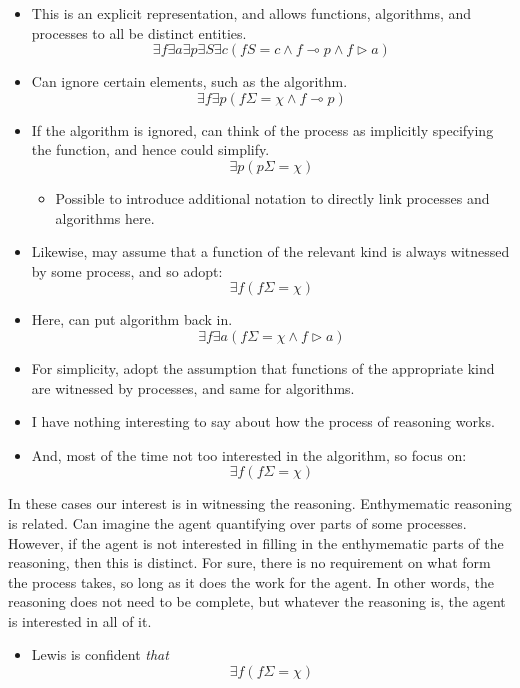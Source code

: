 \documentclass[10pt]{article}
\newcommand{\futin}{\ensuremath{\Sigma}}
\newcommand{\futout}{\ensuremath{\chi}}
\begin{document}
\begin{itemize}
\item This is an explicit representation, and allows functions, algorithms, and processes to all be distinct entities.
  \[\exists f \exists a \exists p \exists S \exists c(fS = c \land f \multimap p \land f \triangleright a)\]
\item Can ignore certain elements, such as the algorithm.
  \[\exists f \exists p(f\futin = \futout \land f \multimap p)\]
\item If the algorithm is ignored, can think of the process as implicitly specifying the function, and hence could simplify.
  \[\exists p(p\futin = \futout)\]
  \begin{itemize}
  \item Possible to introduce additional notation to directly link processes and algorithms here.
  \end{itemize}
\item Likewise, may assume that a function of the relevant kind is always witnessed by some process, and so adopt:
  \[\exists f(f\futin = \futout)\]
\item Here, can put algorithm back in.
  \[\exists f \exists a(f\futin = \futout \land f \triangleright a)\]
\item For simplicity, adopt the assumption that functions of the appropriate kind are witnessed by processes, and same for algorithms.
\item I have nothing interesting to say about how the process of reasoning works.
\item And, most of the time not too interested in the algorithm, so focus on:
  \[\exists f(f\futin = \futout)\]
\end{itemize}

\begin{note}
  In these cases our interest is in witnessing the reasoning.
  Enthymematic reasoning is related.
  Can imagine the agent quantifying over parts of some processes.
  However, if the agent is not interested in filling in the enthymematic parts of the reasoning, then this is distinct.
  For sure, there is no requirement on what form the process takes, so long as it does the work for the agent.
  In other words, the reasoning does not need to be complete, but whatever the reasoning is, the agent is interested in all of it.
\end{note}

\begin{itemize}
\item Lewis is confident \emph{that} \[\exists f(f\futin = \futout)\]
\end{itemize}
\end{document}
